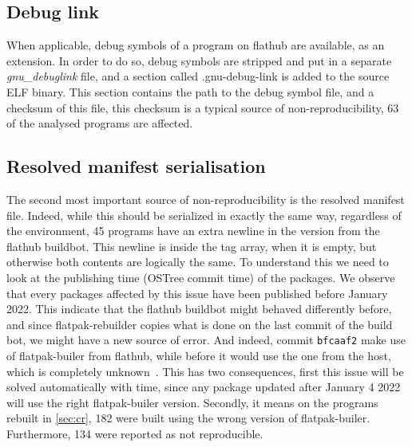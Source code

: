 \documentclass[a4paper,11pt,oneside]{report}
\theoremstyle{definition}
\newcommand{\sysname}{flatpak-rebuilder\xspace}
\newcommand{\fh}{flathub\xspace}
\newcommand{\fb}{flatpak-builer\xspace}
\newcommand{\fhbb}{flathub buildbot\xspace}
\begin{document}
\subsection*{Debug link}
When applicable, debug symbols of a program on \fh are available, as an
extension. In order to do so, debug symbols are stripped and put in a separate
\emph{gnu\_debuglink} file, and a section called .gnu-debug-link is added to the
source ELF binary. This section contains the path to the debug symbol file, and
a checksum of this file, this checksum is a typical source of
non-reproducibility, 63 of the analysed programs are affected.


\subsection*{Resolved manifest serialisation}
The second most important source of non-reproducibility is the resolved
manifest file. Indeed, while this should be serialized in exactly the same way,
regardless of the environment, 45 programs have an extra newline in the version
from the \fhbb. This newline is inside the tag array, when it is empty, but
otherwise both contents are logically the same. To understand this we need to
look at the publishing time (OSTree commit time) of the packages. We observe
that every packages affected by this issue have been published before January
2022. This indicate that the \fhbb might behaved differently before, and since
\sysname copies what is done on the last commit of the build bot, we might have
a new source of error. And indeed, commit \verb|bfcaaf2| make use of \fb from
\fh, while before it would use the one from the host, which is completely
unknown~\cite{gh:ptdr}. This has two consequences, first this issue will be
solved automatically with time, since any package updated after January 4 2022
will use the right \fb version. Secondly, it means on the programs rebuilt in
\autoref{sec:cr}, 182 were built using the wrong version of \fb. Furthermore,
134 were reported as not reproducible.
\end{document}

